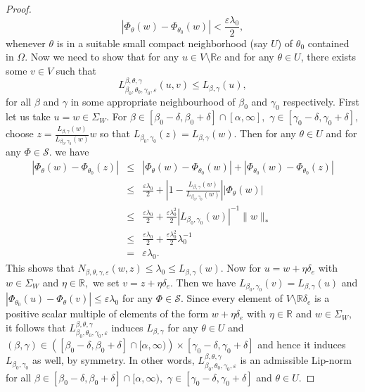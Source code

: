 \documentclass[a4paper,11pt,reqno]{amsart}
\theoremstyle{plain}
\theoremstyle{mainthmstyle}
\theoremstyle{named}
\numberwithin{equation}{section}
\newcommand{\Bea}{\begin{eqnarray*}}
\newcommand{\Eea}{\end{eqnarray*}}
\begin{document}
\begin{proof}
$$\left \lvert \Phi_{\theta} (w) - \Phi_{\theta_0} (w) \right \rvert < \frac {\varepsilon \lambda_0} {2},$$ whenever $\theta$ is in a suitable small compact neighborhood (say $U$) of $\theta_0$ contained in $\Omega.$ Now we need to show that for any $u \in V \setminus \mathbb R e$ and for any $\theta\in U$, there exists some $v \in V$ such that $$L_{\beta_0, \theta_0, \gamma_0, \varepsilon}^{\beta,\theta,\gamma} (u, v) \leq L_{\beta,\gamma} (u),$$ for all $\beta$ and $\gamma$ in some appropriate neighbourhood of $\beta_0$ and $\gamma_0$ respectively. First let us take $u = w \in \Sigma_W.$ For $\beta \in \left [\beta_0 - \delta, \beta_0 + \delta \right ] \cap [\alpha, \infty],$ $\gamma \in \left [\gamma_0 - \delta, \gamma_0 + \delta \right ],$ choose $z = \frac {L_{\beta, \gamma} (w)} {L_{\beta_0, \gamma_0} (w)} w$ so that $L_{\beta_0, \gamma_0} (z) = L_{\beta, \gamma} (w).$ Then for any $\theta\in U$ and for any $\Phi \in \mathcal S$. we have
\Bea
\left \lvert \Phi_{\theta} (w) - \Phi_{\theta_0} (z) \right \rvert & \leq & \left \lvert \Phi_{\theta} (w) - \Phi_{\theta_0} (w) \right \rvert + \left \lvert \Phi_{\theta_0} (w) - \Phi_{\theta_0} (z) \right \rvert \\ & \leq & \frac {\varepsilon \lambda_0} {2} + \left \lvert 1 - \frac {L_{\beta, \gamma} (w)} {L_{\beta_0, \gamma_0} (w)} \right \rvert \left \lvert \Phi_{\theta} (w) \right \rvert \\ & \leq & \frac {\varepsilon \lambda_0} {2} + \frac {\varepsilon \lambda_0^{2}} {2} \left \lvert L_{\beta_0, \gamma_0} (w) \right \rvert^{-1} \|w\|_{\ast} \\ & \leq & \frac {\varepsilon \lambda_0} {2} + \frac {\varepsilon \lambda_0^{2}} {2} \lambda_0^{-1} \\ & = & \varepsilon \lambda_0.     
\Eea
This shows that $N_{\beta,\theta, \gamma, \varepsilon} (w, z) \leq \lambda_0 \leq L_{\beta, \gamma} (w).$ Now for $u = w + \eta \delta_e$ with $w \in \Sigma_W$ and $\eta \in \mathbb R,$ we set $v = z + \eta \delta_e.$ Then we have $L_{\beta_0, \gamma_0} (v) =L_{\beta, \gamma} (u)$ and $\left \lvert \Phi_{\theta_0} (u) - \Phi_{\theta} (v) \right \rvert \leq \varepsilon \lambda_0$ for any $\Phi \in \mathcal S.$ Since every element of $V \setminus \mathbb R \delta_e$ is a positive scalar multiple of elements of the form $w + \eta \delta_e$ with $\eta \in \mathbb R$ and $w \in \Sigma_W,$ it follows that $L_{\beta_0, \theta_0, \gamma_0, \varepsilon}^{\beta,\theta,\gamma}$ induces $L_{\beta, \gamma}$ for any $\theta\in U$ and $(\beta,\gamma) \in \left (\left [\beta_0 - \delta, \beta_0 + \delta \right ] \cap [\alpha, \infty) \right ) \times [\gamma_0-\delta,\gamma_0+\delta]$ and hence it induces $L_{\beta_0, \gamma_0}$ as well, by symmetry. In other words, $L_{\beta_0, \theta_0, \gamma_0, \varepsilon}^{\beta,\theta,\gamma}$ is an admissible Lip-norm for all $\beta \in \left [\beta_0 - \delta, \beta_0 + \delta \right ] \cap [\alpha, \infty),$ $\gamma \in \left [\gamma_0 - \delta, \gamma_0 + \delta \right ]$ and $\theta\in U$. 

\end{proof}
\end{document}
